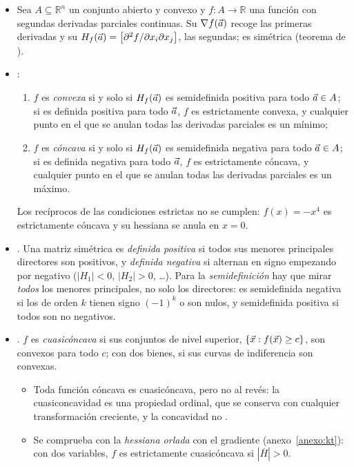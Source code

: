 \documentclass[11pt]{article}
\begin{document}
\begin{itemize}
\item Sea $A\subseteq\mathbb{R}^n$ un conjunto abierto y convexo y $f:A\to\mathbb{R}$ una función con segundas derivadas parciales continuas. Su  $\nabla f(\vec{a})$ recoge las primeras derivadas y su  $H_f(\vec{a})=\big[\partial^2f/\partial x_i\partial x_j\big]$, las segundas; es simétrica (teorema de ).
\item {}:
  \begin{enumerate}
  \item $f$ es \emph{convexa} si y solo si $H_f(\vec{a})$ es semidefinida positiva para todo $\vec{a}\in A$; si es definida positiva para todo $\vec{a}$, $f$ es estrictamente convexa, y cualquier punto en el que se anulan todas las derivadas parciales es un mínimo;
  \item $f$ es \emph{cóncava} si y solo si $H_f(\vec{a})$ es semidefinida negativa para todo $\vec{a}\in A$; si es definida negativa para todo $\vec{a}$, $f$ es estrictamente cóncava, y cualquier punto en el que se anulan todas las derivadas parciales es un máximo.
  \end{enumerate}
  Los recíprocos de las condiciones estrictas no se cumplen: $f(x)=-x^4$ es estrictamente cóncava y su hessiana se anula en $x=0$.
\item {}. Una matriz simétrica es \emph{definida positiva} si todos sus menores principales directores son positivos, y \emph{definida negativa} si alternan en signo empezando por negativo ($|H_1|<0$, $|H_2|>0$, …). Para la \emph{semidefinición} hay que mirar \emph{todos} los menores principales, no solo los directores: es semidefinida negativa si los de orden $k$ tienen signo $(-1)^k$ o son nulos, y semidefinida positiva si todos son no negativos\nocite{SydsaeterEtAl2008Further}.
\item {}. $f$ es \emph{cuasicóncava} si sus conjuntos de nivel superior, $\{\vec{x}: f(\vec{x})\geq c\}$, son convexos para todo $c$; con dos bienes, si sus curvas de indiferencia son convexas.
  \begin{itemize}
  \item Toda función cóncava es cuasicóncava, pero no al revés: la cuasiconcavidad es una propiedad ordinal, que se conserva con cualquier transformación creciente, y la concavidad no .
  \item Se comprueba con la \emph{hessiana orlada} con el gradiente (anexo~\ref{anexo:kt}): con dos variables, $f$ es estrictamente cuasicóncava si $|\overline{H}|>0$.

\end{itemize}
\end{itemize}
\end{document}
